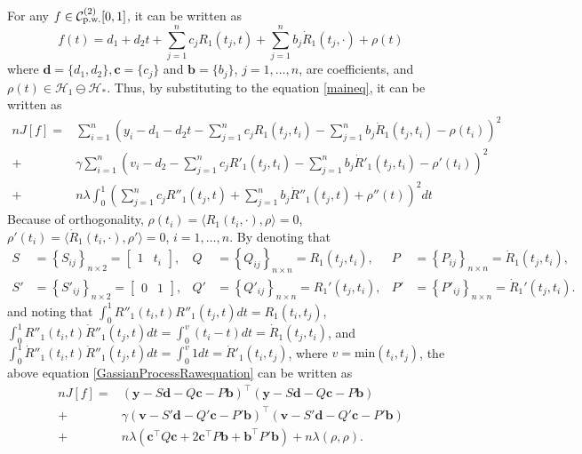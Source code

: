 For any $f\in\mathcal{C}_{\mbox{\scriptsize p.w.}}^{(2)}[0,1]$, it can be written as 
\begin{equation}\label{GaussianProcessFunctionF}
f(t)=d_1+d_2t+\sum_{j=1}^{n}c_jR_1(t_j,t)+\sum_{j=1}^{n}b_j\dot{R}_1(t_j,\cdot) +\rho(t)
\end{equation}
where $\mathbf{d}=\lbrace d_1,d_2\rbrace,\mathbf{c}=\lbrace c_j\rbrace$ and $\mathbf{b}=\lbrace b_j\rbrace$, $j=1,\ldots,n$, are coefficients, and $\rho(t) \in \mathcal{H}_1 \ominus \mathcal{H}_*$. Thus, by substituting to the equation \eqref{maineq}, it can be written as 
\begin{equation}\label{GassianProcessRawequation}
\begin{split}
nJ[f]=&\sum_{i=1}^n \left( y_i - d_1-d_2t-\sum_{j=1}^{n}c_jR_1(t_j,t_i)-\sum_{j=1}^{n}b_j\dot{R}_1(t_j,t_i)-\rho(t_i) \right) ^2\\
+&\gamma\sum_{i=1}^n \left( v_i - d_2-\sum_{j=1}^{n}c_jR'_1(t_j,t_i)-\sum_{j=1}^{n}b_j\dot{R}'_1(t_j,t_i)-\rho'(t_i) \right) ^2\\
+&n\lambda \int_0^1 \left( \sum_{j=1}^{n}c_jR''_1(t_j,t)+\sum_{j=1}^{n}b_j\dot{R}''_1(t_j,t)+\rho''(t)\right)^2dt
\end{split}
\end{equation}
Because of orthogonality, $\rho(t_i) = \langle R_1(t_i,\cdot),\rho\rangle=0$, $\rho'(t_i) = \langle\dot{R}_1(t_i,\cdot),\rho'\rangle=0$, $i=1,\ldots,n$. By denoting that 
\begin{align*}
S&=\left\lbrace S_{ij} \right\rbrace_{n\times 2}=\begin{bmatrix}1 & t_i \end{bmatrix} ,& Q&=\left\lbrace Q_{ij} \right\rbrace_{n\times n}= R_1(t_j,t_i), & P&=\left\lbrace P_{ij} \right\rbrace_{n\times n}= \dot{R}_1(t_j,t_i), \\
S'&=\left\lbrace S'_{ij} \right\rbrace_{n\times 2}=\begin{bmatrix} 0 & 1 \end{bmatrix} ,& Q'&=\left\lbrace Q'_{ij} \right\rbrace_{n\times n}= R_1'(t_j,t_i), & P'&=\left\lbrace P'_{ij} \right\rbrace_{n\times n}= \dot{R}_1'(t_j,t_i). 
\end{align*}
and noting that $\int_0^1R''_1(t_i,t)R''_1(t_j,t)dt=R_1(t_i,t_j)$, $\int_0^1R''_1(t_i,t)\dot{R}''_1(t_j,t)dt=\int_0^{v}(t_i-t)dt=\dot{R}_1(t_j,t_i)$, and $\int_0^1\dot{R}''_1(t_i,t)\dot{R}''_1(t_j,t)dt=\int_0^{v}1dt=\dot{R}'_1(t_i,t_j)$, where $v=\mbox{min}(t_i,t_j)$, the above equation \eqref{GassianProcessRawequation} can be written as 
\begin{equation}\label{matriteq}
\begin{split}
nJ[f]=&\left(\mathbf{y}-S\mathbf{d}-Q\mathbf{c}-P\mathbf{b}\right)^\top \left(\mathbf{y}-S\mathbf{d}-Q\mathbf{c}-P\mathbf{b}\right)\\
+&\gamma\left(\mathbf{v}-S'\mathbf{d}-Q'\mathbf{c}-P'\mathbf{b}\right)^\top \left(\mathbf{v}-S'\mathbf{d}-Q'\mathbf{c}-P'\mathbf{b}\right)\\
+&n\lambda \left(\mathbf{c}^\top Q\mathbf{c} + 2\mathbf{c}^\top P\mathbf{b}+ \mathbf{b}^\top P'\mathbf{b}\right)+n\lambda\left(\rho,\rho\right).
\end{split}
\end{equation}
